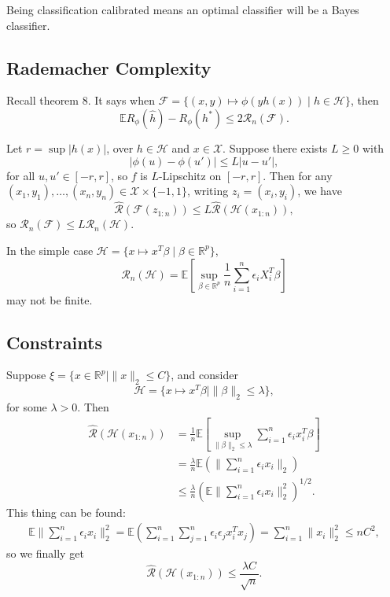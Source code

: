 \documentclass[12pt]{article}
\begin{document}
Being classification calibrated means an optimal classifier will be a Bayes classifier.

\subsection{Rademacher Complexity}
\label{sub:conv_rc}

Recall theorem 8. It says when $\mathcal{F} = \{(x, y) \mapsto \phi(yh(x)) \mid h \in \mathcal{H}\}$, then
\[
\mathbb{E} R_\phi(\hat h) - R_\phi(h^\ast) \leq 2 \mathcal{R}_n(\mathcal{F}).
\]
\begin{lemma}
	Let $r = \sup |h(x)|$, over $h \in \mathcal{H}$ and $x \in \mathcal{X}$. Suppose there exists $L \geq 0$ with
	\[
	|\phi(u) - \phi(u')| \leq L|u - u'|,
	\]
	for all $u, u' \in [-r, r]$, so $f$ is $L$-Lipschitz on $[-r, r]$. Then for any $(x_1, y_1), \ldots, (x_n, y_n) \in \mathcal{X} \times \{-1, 1\}$, writing $z_i = (x_i, y_i)$, we have
	\[
		\hat{\mathcal{R}}(\mathcal{F}(z_{1:n})) \leq L \hat{\mathcal{R}}(\mathcal{H}(x_{1:n})),
	\]
	so $\mathcal{R}_n(\mathcal{F}) \leq L \mathcal{R}_n(\mathcal{H})$.
\end{lemma}

In the simple case $\mathcal{H} = \{x \mapsto x^T \beta \mid \beta \in \mathbb{R}^p\}$,
\[
\mathcal{R}_n(\mathcal{H}) = \mathbb{E} \left[ \sup_{\beta \in \mathbb{R}^p} \frac{1}{n} \sum_{i = 1}^n \epsilon_i X_i^T \beta \right]
\]
may not be finite.

\subsection{Constraints}
\label{sub:const}

Suppose $\xi = \{x \in \mathbb{R}^p \mid \|x\|_2 \leq C\}$, and consider
\[
	\mathcal{H} = \{x \mapsto x^T \beta \mid \|\beta\|_2 \leq \lambda\},
\]
for some $\lambda > 0$. Then
\begin{align*}
	\hat{\mathcal{R}} (\mathcal{H}(x_{1:n})) &= \frac{1}{n} \mathbb{E}\left[ \sup_{\|\beta\|_2 \leq \lambda} \sum_{i = 1}^n \epsilon_i x_i^T \beta \right] \\
						 &= \frac{\lambda}{n} \mathbb{E} \left( \biggl\| \sum_{i =1}^n \epsilon_i x_i\biggr\|_2 \right) \\
						 &\leq \frac{\lambda}{n} \left( \mathbb{E} \biggl\|\sum_{i= 1}^n \epsilon_i x_i\biggr\|_2^2 \right)^{1/2}.
\end{align*}
This thing can be found:
\begin{align*}
	\mathbb{E} \biggl\|\sum_{i = 1}^n \epsilon_i x_i \biggr\|_2^2 = \mathbb{E} \left( \sum_{i = 1}^n \sum_{j = 1}^n \epsilon_i \epsilon_j x_i^T x_j \right) = \sum_{i = 1}^n \|x_i\|_2^2 \leq nC^2,
\end{align*}
so we finally get
\[
	\hat{\mathcal{R}}(\mathcal{H}(x_{1:n})) \leq \frac{\lambda C}{\sqrt n}.
\]
\end{document}
